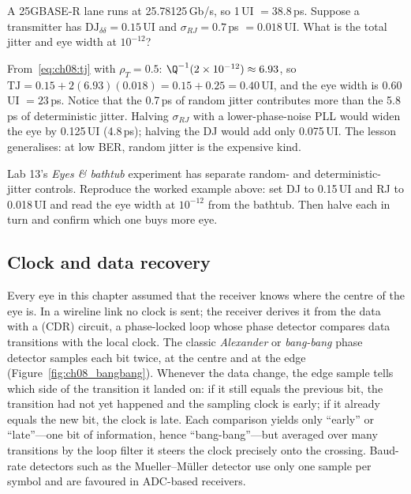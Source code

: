 
\begin{worked}
A 25GBASE-R lane runs at 25.78125\,Gb/s, so 1\,UI $=38.8$\,ps. Suppose a transmitter has
$\mathrm{DJ}_{\delta\delta}=0.15$\,UI and $\sigma_{RJ}=0.7$\,ps $=0.018$\,UI. What is the total
jitter and eye width at $10^{-12}$?

From~\eqref{eq:ch08:tj} with $\rho_T=0.5$: $\Q^{-1}(2\times10^{-12})\approx6.93$, so
$\mathrm{TJ}=0.15+2(6.93)(0.018)=0.15+0.25=0.40$\,UI, and the eye width is $0.60$\,UI
$=23$\,ps. Notice that the 0.7\,ps of random jitter contributes more than the 5.8\,ps of
deterministic jitter. Halving $\sigma_{RJ}$ with a lower-phase-noise PLL would widen the eye by
0.125\,UI (4.8\,ps); halving the DJ would add only 0.075\,UI. The lesson generalises: at low
BER, random jitter is the expensive kind.
\end{worked}

\begin{tryit}
Lab 13's \emph{Eyes \& bathtub} experiment has separate random- and deterministic-jitter
controls. Reproduce the worked example above: set DJ to 0.15\,UI and RJ to 0.018\,UI and read
the eye width at $10^{-12}$ from the bathtub. Then halve each in turn and confirm which one
buys more eye.
\end{tryit}

\subsection{Clock and data recovery}

Every eye in this chapter assumed that the receiver knows where the centre of the eye is. In a
wireline link no clock is sent; the receiver derives it from the data with a
 (CDR) circuit, a phase-locked loop whose phase detector compares
data transitions with the local clock. The classic \emph{Alexander} or \emph{bang-bang} phase
detector samples each bit twice, at the centre and at the edge
(Figure~\ref{fig:ch08_bangbang}). Whenever the data change, the edge sample tells which side of
the transition it landed on: if it still equals the previous bit, the transition had not yet
happened and the sampling clock is early; if it already equals the new bit, the clock is late.
Each comparison yields only ``early'' or ``late''---one bit of information, hence
``bang-bang''---but averaged over many transitions by the loop filter it steers the clock
precisely onto the crossing. Baud-rate detectors such as the Mueller--M\"uller detector use
only one sample per symbol and are favoured in ADC-based receivers.

